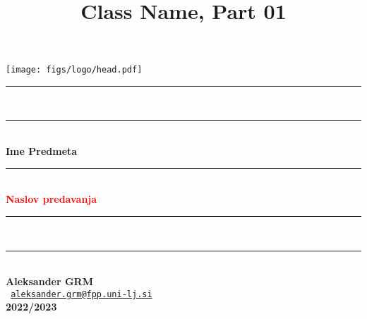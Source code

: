 \documentclass[8pt,aspectratio=169]{beamer} %
\title{Class Name, Part 01}
\author[A. GRM]{}
\begin{document}

\begin{frame}[plain,noframenumbering,label=titlepage]
	\begin{center}
		\texttt{[image: figs/logo/head.pdf]}\\
		\vspace{5mm}%
		\hspace*{0mm}\rule{120mm}{1mm}\\
		\vspace*{-2mm}%
		\hspace*{0mm}\rule{120mm}{0.5mm}\\
		\vspace*{2.5mm}
		{\Huge \textbf{Ime Predmeta}}\\
		\vspace*{0.5mm}
		\hspace*{0mm}\rule{80mm}{0.5mm}\\
		\vspace{2mm}
		\large{\textbf{\textcolor{red}{Naslov predavanja}}}\\[2mm]
		\vspace*{-2mm}%
		\hspace*{0mm}\rule{120mm}{0.5mm}\\
		\vspace*{-1.5mm}%
		\hspace*{0mm}\rule{120mm}{1mm}\\
		\vspace*{5mm}
		\small{\textbf{Aleksander GRM}}\\[1mm]
		\footnotesize{\texttt{ \href{mailto:aleksander.grm@fpp.uni-lj.si}{aleksander.grm@fpp.uni-lj.si}}}\\[4mm]
		\small{\textbf{2022/2023}}
	\end{center}
\end{frame}

\end{document}
